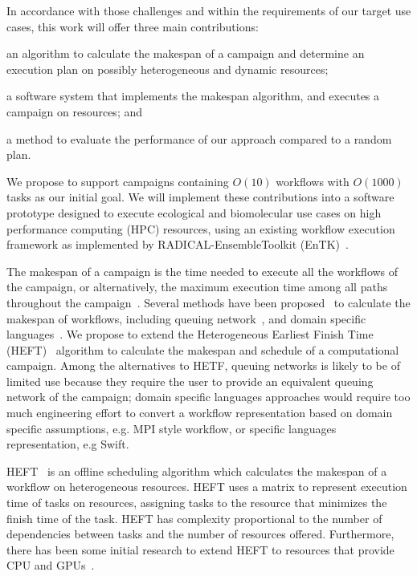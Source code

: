 In accordance with those challenges and within the requirements of our target 
use cases, this work will offer three main contributions: 
\begin{inparaenum}[(1)]
\item an algorithm to 
calculate the makespan of a campaign and determine an execution plan on possibly 
heterogeneous and dynamic resources;
\item a software system that implements the makespan algorithm, and executes a 
campaign on resources; and 
\item a method to evaluate the performance of our approach compared 
to a random plan. 
\end{inparaenum}
We propose to support campaigns containing $O(10)$ workflows with 
$O(1000)$ tasks as our initial goal. We will implement these contributions 
into a software prototype designed to execute ecological and biomolecular use 
cases on high performance computing (HPC) resources, using an existing 
workflow execution framework as implemented by RADICAL-EnsembleToolkit 
(EnTK)~\cite{balasubramanian2018harnessing}.

The makespan of a campaign is the time needed to execute all the workflows of 
the campaign, or alternatively, the maximum execution time among all paths 
throughout the campaign~\cite{chirkin2017execution}. Several methods have been 
proposed~\cite{lu2019review} to calculate the makespan of workflows, including 
queuing network~\cite{yao2019throughput,bao2019performance}, and domain specific 
languages~\cite{carothers2017durango,maheshwari2016workflow}. We propose to 
extend the Heterogeneous Earliest Finish Time (HEFT)~\cite{topcuoglu2002performance} 
algorithm to calculate the makespan and schedule of a computational campaign. 
Among the alternatives to HETF, queuing networks is likely to be of limited use 
because they require the user to provide an equivalent queuing network of the 
campaign; domain specific languages approaches would require too much engineering 
effort to convert a workflow representation based on domain specific assumptions, 
e.g. MPI style workflow, or specific languages representation, e.g Swift.

HEFT~\cite{topcuoglu2002performance} is an offline scheduling algorithm which 
calculates the makespan of a workflow on heterogeneous resources. HEFT uses a 
matrix to represent execution time of tasks on resources, assigning tasks to 
the resource that minimizes the finish time of the task. HEFT has complexity 
proportional to the number of dependencies between tasks and the number of 
resources offered. Furthermore, there has been some initial research to extend 
HEFT to resources that provide CPU and GPUs~\cite{shetti2013optimization}. 

